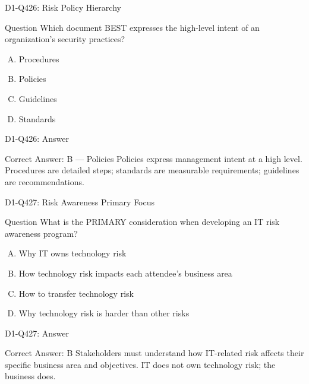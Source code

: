 \documentclass{beamer}
\begin{document}
\begin{frame}{D1-Q426: Risk Policy Hierarchy}
	\begin{block}{Question}
		Which document BEST expresses the high-level intent of an organization's security practices?
	\end{block}
	\begin{enumerate}[(A)]
		\item Procedures
		\item Policies
		\item Guidelines
		\item Standards
	\end{enumerate}
\end{frame}
\begin{frame}{D1-Q426: Answer}
	\begin{block}{Correct Answer: B --- Policies}
		Policies express management intent at a high level. Procedures are detailed steps; standards are measurable requirements; guidelines are recommendations.
	\end{block}
\end{frame}

\begin{frame}{D1-Q427: Risk Awareness Primary Focus}
	\begin{block}{Question}
		What is the PRIMARY consideration when developing an IT risk awareness program?
	\end{block}
	\begin{enumerate}[(A)]
		\item Why IT owns technology risk
		\item How technology risk impacts each attendee's business area
		\item How to transfer technology risk
		\item Why technology risk is harder than other risks
	\end{enumerate}
\end{frame}
\begin{frame}{D1-Q427: Answer}
	\begin{block}{Correct Answer: B}
		Stakeholders must understand how IT-related risk affects their specific business area and objectives. IT does not own technology risk; the business does.
	\end{block}
\end{frame}
\end{document}

